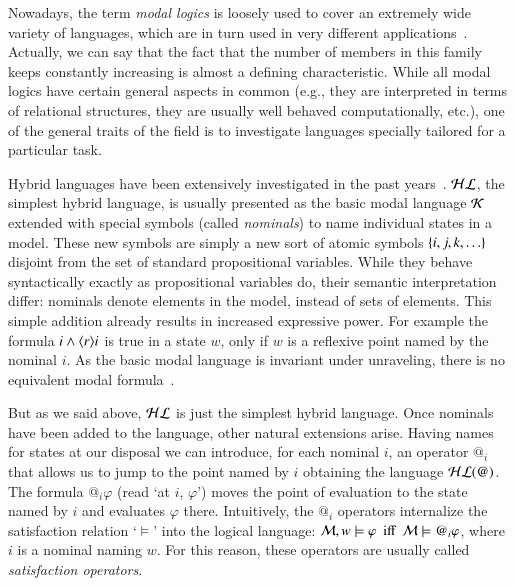 
Nowadays, the term \emph{modal logics} is loosely used to cover 
an extremely wide variety of languages, which are in turn used 
in very different applications~\cite{BRV01,handbook}.  Actually, 
we can say that the fact
that the number of members in this family keeps constantly increasing 
is almost a defining characteristic.  While all modal logics have
certain general aspects in common (e.g., they are interpreted in 
terms of relational structures, they are usually well behaved 
computationally, etc.), one of the general traits of the field is 
to investigate languages specially tailored for a particular task. 


Hybrid languages have been extensively investigated in the past
years~\cite{handbookarticle}. $\mathcal{HL}$, the simplest hybrid language, is usually presented as
the basic modal language $\mathcal{K}$ extended with special symbols (called
\emph{nominals}) to name individual states in a model. These new
symbols are simply a new sort of atomic symbols
$\{i,j,k,\ldots\}$ disjoint from the set of standard
propositional variables. While they behave syntactically exactly as
propositional variables do, their semantic interpretation differ:
nominals denote elements in the model, instead of sets of elements.
This simple addition already results in increased expressive power.
For example the formula $i \wedge \langle r \rangle i$ is true in a state $w$,
only if $w$ is a reflexive point named by the nominal $i$. As the
basic modal language is invariant under unraveling, there is no
equivalent modal formula~\cite{BRV01}.

But as we said above, $\mathcal{HL}$ is just the simplest hybrid language.
Once nominals have been added to the language, other natural
extensions arise.  Having names for states at our disposal we can
introduce, for each nominal $i$, an operator $@_i$ that allows us to
jump to the point named by $i$ obtaining the language $\mathcal{HL}(@)$. The
formula $@_i\varphi$ (read `at $i$, $\varphi$') moves the point of
evaluation to the state named by $i$ and evaluates $\varphi$ there.
Intuitively, the $@_i$ operators internalize the satisfaction
relation `$\models$' into the logical language: $\mathcal{M}, w \models
\varphi \mbox{ ~iff~ } \mathcal{M} \models @_i\varphi$, where $i$ is a
nominal naming $w$. For this reason, these operators are usually
called \emph{satisfaction operators}.

